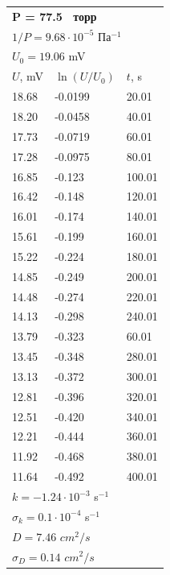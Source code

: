 \documentclass[a4paper,12pt]{article}
\begin{document}
\begin{table}[h!]
\begin{center}
\begin{tabular}{||l|l|l||}
				
				
				
				\multicolumn{3}{||l||}{\textbf{P = 77.5  торр}} \\ 
				\multicolumn{3}{||l||}{$1 / P = 9.68 \cdot 10^{-5}$ $Па^{-1}$} \\ \hline
				\multicolumn{3}{||l||}{$U_0 = 19.06$ mV} \\ \hline
				$U$, mV&$\ln (U/U_0)$ & $t$, s \\ \hline
				18.68 & -0.0199  &20.01 \\ \hline
				18.20 &  -0.0458 &40.01 \\ \hline
				17.73 & -0.0719&60.01  \\ \hline
				17.28 & -0.0975 &80.01  \\ \hline
				16.85 & -0.123 &100.01  \\ \hline
				16.42  & -0.148 &120.01  \\ \hline
				16.01& 	-0.174&140.01  \\ \hline
				15.61& -0.199&160.01  \\ \hline
				15.22& -0.224 &180.01  \\ \hline
				14.85& -0.249 &200.01  \\ \hline
				14.48& -0.274  &220.01  \\ \hline
				14.13& -0.298 &240.01 \\ \hline
				13.79& -0.323 &60.01\\ \hline
				13.45& -0.348 &280.01  \\ \hline
				13.13& -0.372  &300.01  \\ \hline
				12.81&-0.396& 320.01  \\ \hline
				12.51& -0.420&340.01  \\ \hline
				12.21&-0.444& 360.01  \\ \hline
				11.92& 	-0.468 &380.01  \\ \hline
				11.64& -0.492&400.01  \\ \hline
				\multicolumn{3}{||l||}{$k = -1.24\cdot 10^{-3}$ s$^{-1}$} \\ 
				\multicolumn{3}{||l||}{$\sigma_k =0.1 \cdot 10^{-4}$ s$^{-1}$} \\ \hline 
				\multicolumn{3}{||l||}{$D = 7.46 $ $cm^2/s$}\\ 
				\multicolumn{3}{||l||}{$\sigma_D =0.14$ $cm^2/s$} \\ \hline 
			\end{tabular}
			
			
			
			
		\end{center}
		
	\end{table}
	
\end{document}
